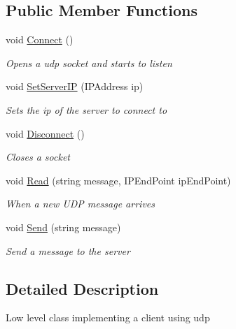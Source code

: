 \subsection*{Public Member Functions}
\begin{DoxyCompactItemize}
\item 
void \mbox{\hyperlink{class_enhanced_dodo_server_1_1_u_d_p_protocol_client_afdf1531cef600c0e98e0f0ec9aaa7f45}{Connect}} ()
\begin{DoxyCompactList}\small\item\em Opens a udp socket and starts to listen \end{DoxyCompactList}\item 
void \mbox{\hyperlink{class_enhanced_dodo_server_1_1_u_d_p_protocol_client_a7e51c05ccc4f89a74fa293eebd1bde75}{Set\+Server\+IP}} (I\+P\+Address ip)
\begin{DoxyCompactList}\small\item\em Sets the ip of the server to connect to \end{DoxyCompactList}\item 
void \mbox{\hyperlink{class_enhanced_dodo_server_1_1_u_d_p_protocol_client_af47907923f36ba9b5145dcbd3a38eb7e}{Disconnect}} ()
\begin{DoxyCompactList}\small\item\em Closes a socket \end{DoxyCompactList}\item 
void \mbox{\hyperlink{class_enhanced_dodo_server_1_1_u_d_p_protocol_client_a75835388425e7fc29d56ca8605825ff3}{Read}} (string message, I\+P\+End\+Point ip\+End\+Point)
\begin{DoxyCompactList}\small\item\em When a new U\+DP message arrives \end{DoxyCompactList}\item 
void \mbox{\hyperlink{class_enhanced_dodo_server_1_1_u_d_p_protocol_client_a1244ef98c96f878d8f749267359d3462}{Send}} (string message)
\begin{DoxyCompactList}\small\item\em Send a message to the server \end{DoxyCompactList}\end{DoxyCompactItemize}


\subsection{Detailed Description}
Low level class implementing a client using udp 



